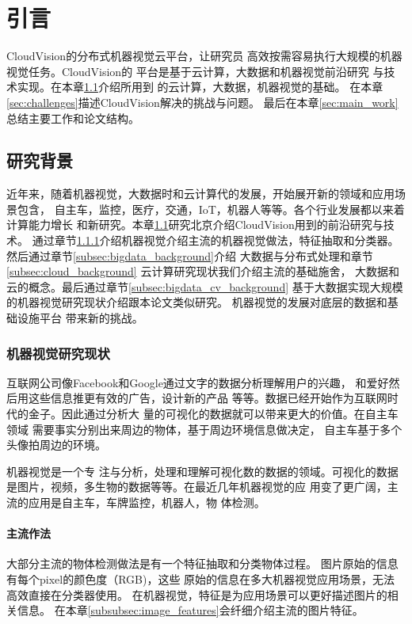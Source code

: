 \chapter{引言}
\label{cha:intro}
CloudVision的分布式机器视觉云平台，让研究员
高效按需容易执行大规模的机器视觉任务。CloudVision的
平台是基于云计算，大数据和机器视觉前沿研究
与技术实现。在本章\ref{sec:background}介绍所用到
的云计算，大数据，机器视觉的基础。
在本章\ref{sec:challenges}描述CloudVision解决的挑战与问题。
最后在本章\ref{sec:main_work}总结主要工作和论文结构。


\section{研究背景}
\label{sec:background}
近年来，随着机器视觉，大数据时和云计算代的发展，开始展开新的领域和应用场景包含，
自主车，监控，医疗，交通，IoT，机器人等等。各个行业发展都以来着计算能力增长
和新研究。本章\ref{sec:background}研究北京介绍CloudVision用到的前沿研究与技术。
通过章节\ref{subsec:cv_background}介绍机器视觉介绍主流的机器视觉做法，特征抽取和分类器。
然后通过章节\ref{subsec:bigdata_background}介绍
大数据与分布式处理和章节\ref{subsec:cloud_background}
云计算研究现状我们介绍主流的基础施舍，
大数据和云的概念。最后通过章节\ref{subsec:bigdata_cv_background}
基于大数据实现大规模的机器视觉研究现状介绍跟本论文类似研究。
机器视觉的发展对底层的数据和基础设施平台
带来新的挑战。

\subsection{机器视觉研究现状}
\label{subsec:cv_background}
互联网公司像Facebook和Google通过文字的数据分析理解用户的兴趣，
和爱好然后用这些信息推更有效的广告，设计新的产品
等等。数据已经开始作为互联网时代的金子。因此通过分析大
量的可视化的数据就可以带来更大的价值。在自主车领域
需要事实分别出来周边的物体，基于周边环境信息做决定，
自主车基于多个头像拍周边的环境。

机器视觉是一个专
注与分析，处理和理解可视化数的数据的领域。可视化的数据
是图片，视频，多生物的数据等等。在最近几年机器视觉的应
用变了更广阔，主流的应用是自主车，车牌监控，机器人，物
体检测。


\subsubsection{主流作法}
大部分主流的物体检测做法是有一个特征抽取和分类物体过程。\cite{juan2009comparison}
图片原始的信息有每个pixel的颜色度（RGB)，这些
原始的信息在多大机器视觉应用场景，无法高效直接在分类器使用。
在机器视觉，特征是为应用场景可以更好描述图片的相关信息。
在本章\ref{subsubsec:image_features}会纤细介绍主流的图片特征。


